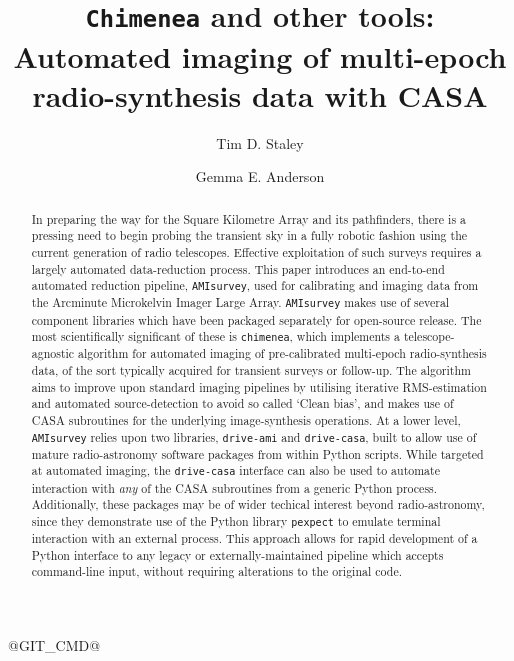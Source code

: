 \documentclass[5p,authoryear]{elsarticle}
\begin{document}
\newcommand{\code}[1]{\texttt{#1}}
\newcommand{\degrees}[1]{$#1^\circ$}

@GIT_CMD@

\begin{frontmatter}

\title{\texttt{Chimenea} and other tools: \\ Automated imaging of multi-epoch radio-synthesis data with CASA }

\author[oxford]{Tim D. Staley}
\author[oxford]{Gemma E. Anderson}

\address[oxford]{Department of Physics, University of Oxford, Denys Wilkinson Building, Keble Road, Oxford, OX1 3RH, UK}

\begin{abstract}
In preparing the way for the Square Kilometre Array and its pathfinders, there is a pressing need to begin probing the transient sky in a fully robotic fashion using the current generation of radio telescopes. Effective exploitation of such surveys requires a largely automated data-reduction process.
This paper introduces an end-to-end automated reduction pipeline, \texttt{AMIsurvey}, used for calibrating and imaging data from the Arcminute Microkelvin Imager Large Array. 
\texttt{AMIsurvey} makes use of several component libraries which have been packaged separately for open-source release. 
The most scientifically significant of these is \texttt{chimenea}, which implements a telescope-agnostic algorithm for automated imaging of pre-calibrated multi-epoch radio-synthesis data, of the sort typically acquired for transient surveys or follow-up.
The algorithm aims to improve upon standard imaging pipelines by utilising iterative RMS-estimation and automated source-detection to avoid so called `Clean bias', and makes use of CASA subroutines for the underlying image-synthesis operations.
At a lower level, \texttt{AMIsurvey} relies upon two libraries, \texttt{drive-ami} and \texttt{drive-casa}, built to allow use of mature radio-astronomy software packages from within Python scripts. 
While targeted at automated imaging, the \texttt{drive-casa} interface can also be used to automate interaction with \textit{any} of the CASA subroutines from a generic Python process.
Additionally, these packages may be of wider techical interest beyond radio-astronomy, since they demonstrate use of the Python library \texttt{pexpect} to emulate terminal interaction with an external process. 
This approach allows for rapid development of a Python interface to any legacy or externally-maintained pipeline which accepts command-line input, without requiring alterations to the original code.


\end{abstract}
\end{frontmatter}
\end{document}
